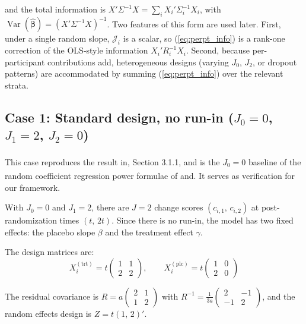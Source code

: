 \documentclass[
  11pt,
]{article}
\begin{document}
and the total information is \(X' \Sigma^{-1} X = \sum_i
X_i' \Sigma_i^{-1} X_i\), with \(\mathop{\mathrm{Var}}(\hat{\boldsymbol{\beta}})
= (X' \Sigma^{-1} X)^{-1}\). Two features of this form are used
later. First, under a single random slope, \(\mathcal{J}_i\) is
a scalar, so (\ref{eq:perpt_info}) is a rank-one correction of
the OLS-style information \(X_i' R_i^{-1} X_i\). Second, because
per-participant contributions add, heterogeneous designs
(varying \(J_0\), \(J_2\), or dropout patterns) are accommodated by
summing (\ref{eq:perpt_info}) over the relevant strata.

\subsection{\texorpdfstring{Case 1: Standard design, no run-in (\(J_0=0\), \(J_1=2\), \(J_2=0\))}{Case 1: Standard design, no run-in (J\_0=0, J\_1=2, J\_2=0)}}\label{case-1-standard-design-no-run-in-j_00-j_12-j_20}

This case reproduces the result in\textsuperscript{}, Section 3.1.1, and
is the \(J_0 = 0\) baseline of the random coefficient regression
power formulae of\textsuperscript{} and\textsuperscript{}. It serves as
verification for our framework.

With \(J_0=0\) and \(J_1=2\), there are \(J = 2\) change scores
\((c_{i,1},\, c_{i,2})\) at post-randomization times \((t,\,
2t)\). Since there is no run-in, the model has two fixed
effects: the placebo slope \(\beta\) and the treatment effect
\(\gamma\).

The design matrices are:
\[
  X_i^{(\text{trt})} = t\begin{pmatrix}
    1 & 1 \\ 2 & 2
  \end{pmatrix}, \qquad
  X_i^{(\text{plc})} = t\begin{pmatrix}
    1 & 0 \\ 2 & 0
  \end{pmatrix}
\]

The residual covariance is
\(R = a \begin{pmatrix} 2 & 1 \\ 1 & 2 \end{pmatrix}\)
with \(R^{-1} = \frac{1}{3a}
\begin{pmatrix} 2 & -1 \\ -1 & 2 \end{pmatrix}\),
and the random effects design is \(Z = t(1,\, 2)'\).
\end{document}
